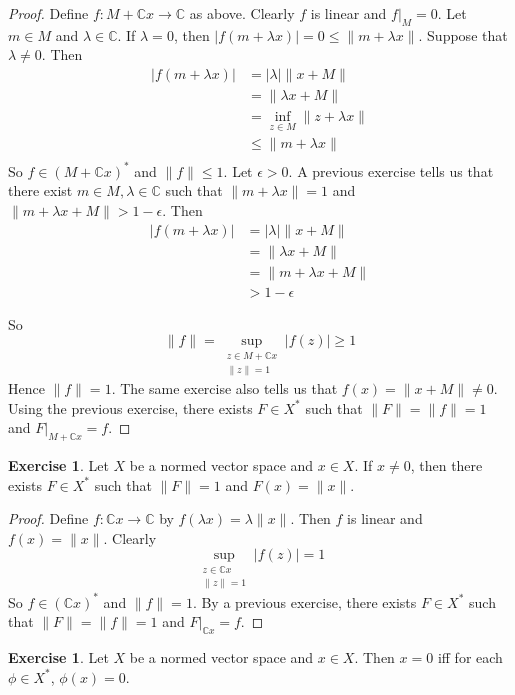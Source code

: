 \documentclass[12pt]{amsart}
\theoremstyle{definition}
\newtheorem{ex}[definition]{Exercise}
\newcommand{\lam}{\lambda}
\newcommand{\ep}{\epsilon}
\newcommand{\C}{\mathbb{C}}
\newcommand{\lex}[1]{\label{ex:#1}}
\begin{document}
	\begin{proof}
		Define $f:M+\C x \rightarrow \C$ as above. Clearly $f$ is linear and $f|_M = 0$. Let $m \in M$ and $\lam \in \C$. If $\lam = 0$, then $\vert f(m +\lam x) \vert = 0 \leq \|m+ \lam x \|$. Suppose that $\lam \neq 0$. Then 
		\begin{align*}
			\vert f(m+\lam x) \vert 
			& = \vert \lam \vert \|x+M \|\\
			& =  \|\lam x+M \|\\
			& = \inf_{z \in M} \|z+ \lam x \|\\
			& \leq  \|m+ \lam x  \|\\
		\end{align*} 
		So $f \in (M+\C x )^*$ and $\|f \|\leq 1$. Let $\ep >0$. A previous exercise tells us that there exist $m \in M, \lam \in \C$ such that $\|m+ \lam x \|= 1$ and $\|m+ \lam x +M \|> 1- \ep$. Then 
		\begin{align*}
			\vert f(m + \lam x) \vert
			&= \vert \lam \vert \|x+M\|\\
			&=\|\lam x +M \|\\
			&= \|m + \lam x +M \|\\
			&> 1-\ep
		\end{align*}
		
		So $$ \|f \|= \sup_{\substack{z \in M + \C x \\ \|z \|=1}} \vert f(z) \vert \geq 1$$ Hence $\|f \|=1$. 
		The same exercise also tells us that $f(x) = \|x+M\|\neq 0$. Using the previous exercise, there exists $F \in X^*$ such that $\|F \|= \|f \|= 1$ and $F|_{M+\C x} = f$.
	\end{proof}
	
	\begin{ex} \lex{55018}
		Let $X$ be a normed vector space and $x \in X$. If $x \neq 0$, then there exists $F \in X^*$ such that $\|F \|= 1$ and $F(x) = \|x \|$.
	\end{ex}
	
	\begin{proof}
		Define $f:\C x \rightarrow \C$ by $f(\lam x) = \lam \|x \|$. Then $f$ is linear and $f(x) = \|x \|$. Clearly $$\sup_{\substack{z \in \C x \\ \|z \|=1}}\vert f(z) \vert = 1$$ 
		So $f \in (\C x)^*$ and $\|f \|= 1$. By a previous exercise, there exists $F \in X^*$ such that $\|F \|= \|f \|=1$ and $F|_{\C x} = f$. 
	\end{proof}
	
	\begin{ex} \lex{55019}
	Let $X$ be a normed vector space and $x \in X$. Then $x = 0$ iff for each $\phi \in X^*$, $\phi(x) = 0$.
	\end{ex}
	
\end{document}
